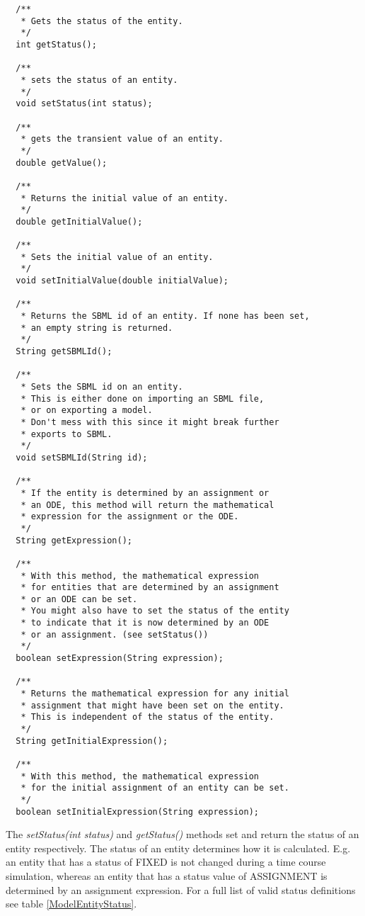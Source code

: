 \documentclass[a4,10pt]{article}
\begin{document}
\begin{lstlisting}
  /**
   * Gets the status of the entity.
   */
  int getStatus();

  /**
   * sets the status of an entity.
   */
  void setStatus(int status);

  /**
   * gets the transient value of an entity.
   */
  double getValue();

  /**
   * Returns the initial value of an entity.
   */
  double getInitialValue();

  /**
   * Sets the initial value of an entity.
   */
  void setInitialValue(double initialValue);

  /**
   * Returns the SBML id of an entity. If none has been set,
   * an empty string is returned.
   */
  String getSBMLId();

  /**
   * Sets the SBML id on an entity.
   * This is either done on importing an SBML file,
   * or on exporting a model.
   * Don't mess with this since it might break further
   * exports to SBML.
   */
  void setSBMLId(String id);

  /**
   * If the entity is determined by an assignment or 
   * an ODE, this method will return the mathematical
   * expression for the assignment or the ODE.
   */
  String getExpression();

  /**
   * With this method, the mathematical expression 
   * for entities that are determined by an assignment
   * or an ODE can be set.
   * You might also have to set the status of the entity
   * to indicate that it is now determined by an ODE 
   * or an assignment. (see setStatus())
   */
  boolean setExpression(String expression);

  /**
   * Returns the mathematical expression for any initial 
   * assignment that might have been set on the entity. 
   * This is independent of the status of the entity.
   */
  String getInitialExpression();

  /**
   * With this method, the mathematical expression 
   * for the initial assignment of an entity can be set.
   */
  boolean setInitialExpression(String expression);
\end{lstlisting}

The \textit{setStatus(int status)} and \textit{getStatus()} methods set and return the status of an entity respectively. The status of an entity determines how it is calculated. E.g. an entity that has a status of FIXED is not changed during a time course simulation, whereas an entity that has a status value of ASSIGNMENT is determined by an assignment expression. For a full list of valid status definitions see table \ref{ModelEntityStatus}.
\end{document}
